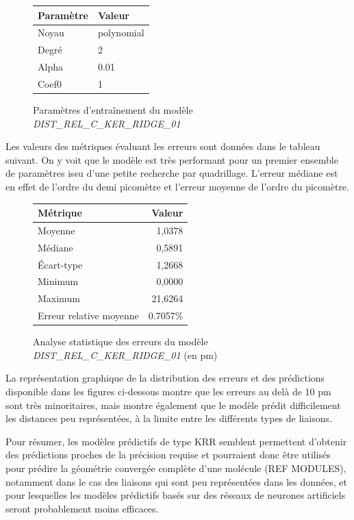 \begin{figure}[!h]
	\centering
	\begin{tabular}{|l|l|}
		\hline
		\textbf{Paramètre} & \textbf{Valeur} \\ \hline
		Noyau & polynomial \\ \hline
		Degré & 2 \\ \hline
		Alpha & 0.01 \\ \hline
		Coef0 & 1 \\ \hline
	\end{tabular}		
	\caption{Paramètres d'entraînement du modèle \emph{DIST\_REL\_C\_KER\_RIDGE\_01}}
\end{figure}

\par Les valeurs des métriques évaluant les erreurs sont données dans le tableau suivant. On y voit que le modèle est très performant pour un premier ensemble de paramètres issu d'une petite recherche par quadrillage. L'erreur médiane est en effet de l'ordre du demi picomètre et l'erreur moyenne de l'ordre du picomètre.

\begin{figure}[!h]
	\centering
	\begin{tabular}{|l|r|}
		\hline
		\textbf{Métrique} & \textbf{Valeur} \\ \hline
		Moyenne & 1,0378 \\ \hline
		Médiane & 0,5891 \\ \hline
		Écart-type & 1,2668 \\ \hline
		Minimum & 0,0000 \\ \hline
		Maximum & 21,6264\\ \hline
		Erreur relative moyenne & 0.7057\% \\ \hline
	\end{tabular}
	
	\caption{Analyse statistique des erreurs du modèle \emph{DIST\_REL\_C\_KER\_RIDGE\_01} (en pm)}
\end{figure}

\par La représentation graphique de la distribution des erreurs et des prédictions disponible dans les figures ci-dessous montre que les erreurs au delà de 10 pm sont très minoritaires, mais montre également que le modèle prédit difficilement les distances peu représentées, à la limite entre les différents types de liaisons.
\par Pour résumer, les modèles prédictifs de type KRR semblent permettent d'obtenir des prédictions proches de la précision requise et pourraient donc être utilisés pour prédire la géométrie convergée complète d'une molécule (REF MODULES), notamment dans le cas des liaisons qui sont peu représentées dans les données, et pour lesquelles les modèles prédictifs basés sur des réseaux de neurones artificiels seront probablement moins efficaces.

